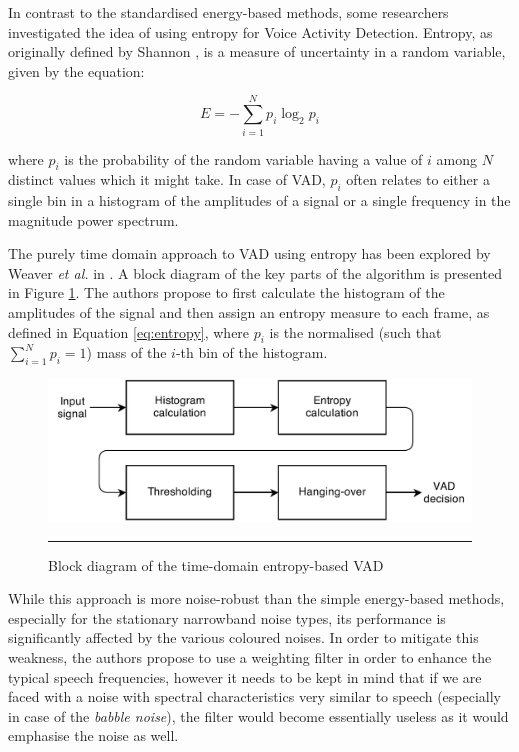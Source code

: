 In contrast to the standardised energy-based methods, some researchers investigated the idea of using entropy for Voice Activity Detection. Entropy, as originally defined by Shannon \cite{Shannon}, is a measure of uncertainty in a random variable, given by the equation:

\begin{equation}
E = - \sum_{i=1}^{N} p_i \log_2 p_i
\label{eq:entropy}
\end{equation}

where $p_i$ is the probability of the random variable having a value of $i$ among $N$ distinct values which it might take. In case of VAD, $p_i$ often relates to either a single bin in a histogram of the amplitudes of a signal or a single frequency in the magnitude power spectrum.

The purely time domain approach to VAD using entropy has been explored by Weaver \emph{et al.} in \cite{Weaver}. A block diagram of the key parts of the algorithm is presented in Figure \ref{fig:Weaver}. The authors propose to first calculate the histogram of the amplitudes of the signal and then assign an entropy measure to each frame, as defined in Equation \ref{eq:entropy}, where $p_i$ is the normalised (such that $\sum_{i=1}^{N} p_i = 1$) mass of the $i$-th bin of the histogram.

\begin{figure}[htbp]
	\centering
		\includegraphics[width=0.9\columnwidth]{Figures/Chapter2/Weaver.png}
		\rule{37em}{0.5pt}
	\caption[Block diagram of the time-domain entropy-based VAD]{Block diagram of the time-domain entropy-based VAD \cite{Weaver}}
	\label{fig:Weaver}
\end{figure}

While this approach is more noise-robust than the simple energy-based methods, especially for the stationary narrowband noise types, its performance is significantly affected by the various coloured noises. In order to mitigate this weakness, the authors propose to use a weighting filter in order to enhance the typical speech frequencies, however it needs to be kept in mind that if we are faced with a noise with spectral characteristics very similar to speech (especially in case of the \emph{babble noise}), the filter would become essentially useless as it would emphasise the noise as well.

